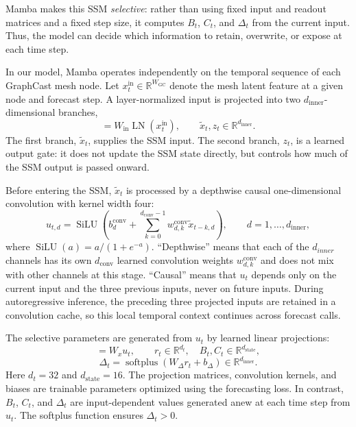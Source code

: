 \documentclass{article}
\begin{document}
Mamba makes this SSM \emph{selective}: rather than using fixed input and readout matrices and a fixed step size, it computes $B_t$, $C_t$, and $\Delta_t$ from the current input. Thus, the model can decide which information to retain, overwrite, or expose at each time step.

In our model, Mamba operates independently on the temporal sequence of each GraphCast mesh node. Let $x_t^{\mathrm{in}}\in\mathbb{R}^{W_{\textrm{GC}}}$ denote the mesh latent feature at a given node and forecast step. A layer-normalized input is projected into two $d_{\textrm{inner}}$-dimensional branches,
\begin{equation}
    [\tilde{x}_t,z_t]
    =
    W_{\mathrm{in}}\operatorname{LN}(x_t^{\mathrm{in}}),
    \qquad
    \tilde{x}_t,z_t\in\mathbb{R}^{d_{\textrm{inner}}}.
\end{equation}
The first branch, $\tilde{x}_t$, supplies the SSM input. The second branch, $z_t$, is a learned output gate: it does not update the SSM state directly, but controls how much of the SSM output is passed onward.

Before entering the SSM, $\tilde{x}_t$ is processed by a depthwise causal one-dimensional convolution with kernel width four:
\begin{equation}
    u_{t,d}
    =
    \operatorname{SiLU}
    \left(
        b^{\mathrm{conv}}_d
        +
        \sum_{k=0}^{d_{\textrm{conv}}-1}
        w^{\mathrm{conv}}_{d,k}\tilde{x}_{t-k,d}
    \right),
    \qquad d=1,\ldots, d_{\textrm{inner}},
\end{equation}
where $\operatorname{SiLU}(a)=a/(1+e^{-a})$. ``Depthwise'' means that each of the $d_{inner}$ channels has its own $d_{\textrm{conv}}$ learned convolution weights $w^{\mathrm{conv}}_{d,k}$ and does not mix with other channels at this stage. ``Causal'' means that $u_t$ depends only on the current input and the three previous inputs, never on future inputs. During autoregressive inference, the preceding three projected inputs are retained in a convolution cache, so this local temporal context continues across forecast calls.

The selective parameters are generated from $u_t$ by learned linear projections:
\begin{equation}
    [r_t,B_t,C_t] = W_xu_t,
    \qquad
    r_t\in\mathbb{R}^{d_t},
    \quad
    B_t,C_t\in\mathbb{R}^{d_{\textrm{state}}},
\end{equation}
\begin{equation}
    \Delta_t
    =
    \operatorname{softplus}(W_\Delta r_t+b_\Delta)
    \in\mathbb{R}^{d_{\textrm{inner}}}.
\end{equation}
Here $d_t=32$ and $d_{\mathrm{state}}=16$. The projection matrices, convolution kernels, and biases are trainable parameters optimized using the forecasting loss. In contrast, $B_t$, $C_t$, and $\Delta_t$ are input-dependent values generated anew at each time step from $u_t$. The softplus function ensures $\Delta_t>0$.
\end{document}

